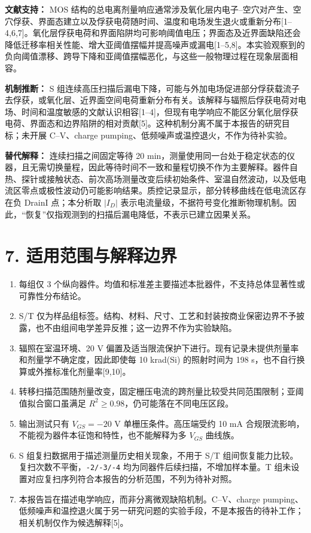 \documentclass[UTF8,a4paper,12pt]{ctexart}
\providecommand{\tightlist}{%
  \setlength{\itemsep}{0pt}\setlength{\parskip}{0pt}}
\begin{document}
\textbf{文献支持：} MOS
结构的总电离剂量响应通常涉及氧化层内电子--空穴对产生、空穴俘获、界面态建立以及俘获电荷随时间、温度和电场发生退火或重新分布{[}1--4,6,7{]}。氧化层俘获电荷和界面陷阱均可影响阈值电压；界面态及近界面缺陷还会降低迁移率相关性能、增大亚阈值摆幅并提高噪声或漏电{[}1--5,8{]}。本实验观察到的负向阈值漂移、跨导下降和亚阈值摆幅恶化，与这些一般物理过程在现象层面相容。

\textbf{机制推断：} S
组连续高压扫描后漏电下降，可能与外加电场促进部分俘获载流子去俘获，或氧化层、近界面空间电荷重新分布有关。该解释与辐照后俘获电荷对电场、时间和温度敏感的文献认识相容{[}1--4{]}，但现有电学响应不能区分氧化层俘获电荷、界面态和边界陷阱的相对贡献{[}5{]}。这种机制分离不属于本报告的研究目标；未开展
C--V、charge pumping、低频噪声或温控退火，不作为待补实验。

\textbf{替代解释：} 连续扫描之间固定等待 20
min，测量使用同一台处于稳定状态的仪器，且无需切换量程，因此等待时间不一致和量程切换不作为主要解释。器件自热、探针或接触状态、前次高场测量改变后续初始条件、室温自然波动，以及低电流区零点或极性波动仍可能影响结果。质控记录显示，部分转移曲线在低电流区存在负
DrainI 点；本分析取 \(|I_D|\)
表示电流量级，不据符号变化推断物理机制。因此，``恢复''仅指观测到的扫描后漏电降低，不表示已建立因果关系。

\section{7.
适用范围与解释边界}\label{ux9002ux7528ux8303ux56f4ux4e0eux89e3ux91caux8fb9ux754c}

\begin{enumerate}
\def\labelenumi{\arabic{enumi}.}
\tightlist
\item
  每组仅 3
  个纵向器件。均值和标准差主要描述本批器件，不支持总体显著性或可靠性分布结论。
\item
  S/T
  仅为样品组标签。结构、材料、尺寸、工艺和封装按商业保密边界不予披露，也不由组间电学差异反推；这一边界不作为实验缺陷。
\item
  辐照在室温环境、20 V
  偏置及适当限流保护下进行。现有记录未提供剂量率和剂量学不确定度，因此即使每
  10 krad(Si) 的照射时间为 198
  s，也不自行换算或外推标准化剂量率{[}9,10{]}。
\item
  转移扫描范围随剂量改变，固定栅压电流的跨剂量比较受共同范围限制；亚阈值拟合窗口虽满足
  \(R^2\ge0.98\)，仍可能落在不同电压区段。
\item
  输出测试只有 \(V_{GS}=-20\) V 单栅压条件。高压端受约 10 mA
  合规限流影响，不能视为器件本征饱和特性，也不能解释为多 \(V_{GS}\)
  曲线族。
\item
  S 组复扫数据用于描述测量历史相关现象，不用于 S/T
  组间恢复能力比较。复扫次数不平衡，\texttt{-2/-3/-4}
  均为同器件后续扫描，不增加样本量。T
  组未设置对应复扫序列符合本报告的分析范围，不列为待补对照。
\item
  本报告旨在描述电学响应，而非分离微观缺陷机制。C--V、charge
  pumping、低频噪声和温控退火属于另一研究问题的实验手段，不是本报告的待补工作；相关机制仅作为候选解释{[}5{]}。
\end{enumerate}
\end{document}
